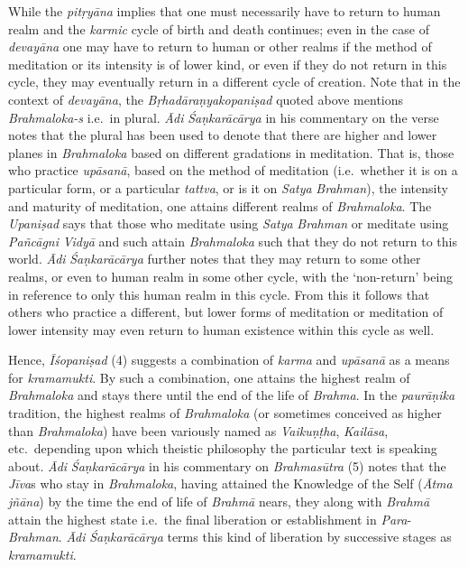 While the \emph{pitṛyāna} implies that one must necessarily have to return to human realm and the \emph{karmic} cycle of birth and death continues; even in the case of \emph{devayāna} one may have to return to human or other realms if the method of meditation or its intensity is of lower kind, or even if they do not return in this cycle, they may eventually return in a different cycle of creation. Note that in the context of \emph{devayāna}, the \emph{Bṛhadāraṇyakopaniṣad} quoted above mentions \emph{Brahmaloka-s} i.e.\ in plural. \emph{Ādi} \emph{Śaṇkarācārya} in his commentary on the verse notes that the plural has been used to denote that there are higher and lower planes in \emph{Brahmaloka} based on different gradations in meditation. That is, those who practice \emph{upāsanā}, based on the method of meditation (i.e.\ whether it is on a particular form, or a particular \emph{tattva}, or is it on \emph{Satya} \emph{Brahman}), the intensity and maturity of meditation, one attains different realms of \emph{Brahmaloka}. The \emph{Upaniṣad} says that those who meditate using \emph{Satya} \emph{Brahman} or meditate using \emph{Pañcāgni} \emph{Vidyā} and such attain \emph{Brahmaloka} such that they do not return to this world. \emph{Ādi} \emph{Śaṇkarācārya} further notes that they may return to some other realms, or even to human realm in some other cycle, with the `non-return' being in reference to only this human realm in this cycle. From this it follows that others who practice a different, but lower forms of meditation or meditation of lower intensity may even return to human existence within this cycle as well.

Hence, \emph{Īśopaniṣad} (4) suggests a combination of \emph{karma} and \emph{upāsanā} as a means for \emph{kramamukti}. By such a combination, one attains the highest realm of \emph{Brahmaloka} and stays there until the end of the life of \emph{Brahma}. In the \emph{paurāṇika} tradition, the highest realms of \emph{Brahmaloka} (or sometimes conceived as higher than \emph{Brahmaloka}) have been variously named as \emph{Vaikuṇṭha}, \emph{Kailāsa}, etc.\ depending upon which theistic philosophy the particular text is speaking about. \emph{Ādi} \emph{Śaṇkarācārya} in his commentary on \emph{Brahmasūtra} (5) notes that the \emph{Jīva}s who stay in \emph{Brahmaloka}, having attained the Knowledge of the Self (\emph{Ātma} \emph{jñāna}) by the time the end of life of \emph{Brahmā} nears, they along with \emph{Brahmā} attain the highest state i.e.\ the final liberation or establishment in \emph{Para}-\emph{Brahman}. \emph{Ādi} \emph{Śaṇkarācārya} terms this kind of liberation by successive stages as \emph{kramamukti}.

